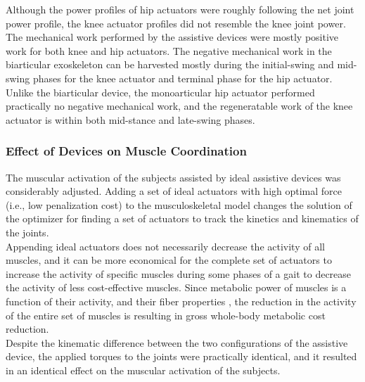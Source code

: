 \documentclass[10pt,letterpaper]{article}
\begin{document}
Although the power profiles of hip actuators were roughly following the net joint power profile, the knee actuator profiles did not resemble the knee joint power. The mechanical work performed by the assistive devices were mostly positive work for both knee and hip actuators. The negative mechanical work in the biarticular exoskeleton can be harvested mostly during the initial-swing and mid-swing phases for the knee actuator and terminal phase for the hip actuator. Unlike the biarticular device, the monoarticular hip actuator performed practically no negative mechanical work, and the regeneratable work of the knee actuator is within both mid-stance and late-swing phases.
\subsubsection*{Effect of Devices on Muscle Coordination}
The muscular activation of the subjects assisted by ideal assistive devices was considerably adjusted. Adding a set of ideal actuators with high optimal force (i.e., low penalization cost) to the musculoskeletal model changes the solution of the optimizer for finding a set of actuators to track the kinetics and kinematics of the joints.\\
Appending ideal actuators does not necessarily decrease the activity of all muscles, and it can be more economical for the complete set of actuators to increase the activity of specific muscles during some phases of a gait to decrease the activity of less cost-effective muscles. Since metabolic power of muscles is a function of their activity, and their fiber properties \cite{106}, the reduction in the activity of the entire set of muscles is resulting in gross whole-body metabolic cost reduction.\\
Despite the kinematic difference between the two configurations of the assistive device, the applied torques to the joints were practically identical, and it resulted in an identical effect on the muscular activation of the subjects.\\
\end{document}
